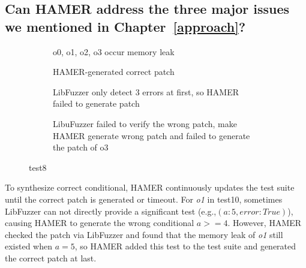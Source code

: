 \documentclass[a4paper,11pt,oneside,openany]{book}
\begin{document}
\vspace{0.4cm}
\hspace{-0.6cm}


\subsection[Research Question 2]{Can HAMER address the three major issues we mentioned in Chapter~\ref{approach}? }

\begin{figure*}[t]
  \begin{subfigure}{0.5\textwidth}
    
    \caption{o0, o1, o2, o3 occur memory leak}
    \label{test8a}
  \end{subfigure}\hfill
  \begin{subfigure}{0.4\textwidth}
    
    \caption{HAMER-generated correct patch}
    \label{test8b}
  \end{subfigure}
  \begin{subfigure}{0.5\textwidth}
    
    \caption{LibFuzzer only detect 3 errors at first, so HAMER failed to generate patch}
    \label{test8c}
  \end{subfigure}\hfill
  \begin{subfigure}{0.4\textwidth}
    
    \caption{LibuFuzzer failed to verify the wrong patch, make HAMER generate wrong patch and failed to generate the patch of o3}
    \label{test8d}
  \end{subfigure}
  \caption{test8} 
  \label{test8}
\end{figure*}


To synthesize correct conditional, HAMER continuously updates the test suite until the correct patch is generated or timeout. For {\it o1} in test10, sometimes LibFuzzer can not directly provide a significant test (e.g.,$(a: 5, error: True)$),  causing HAMER to generate the wrong conditional $a>=4$. However, HAMER checked the patch via LibFuzzer and found that the memory leak of {\it o1} still existed when $a=5$, so HAMER added this test to the test suite and generated the correct patch at last.
\end{document}
